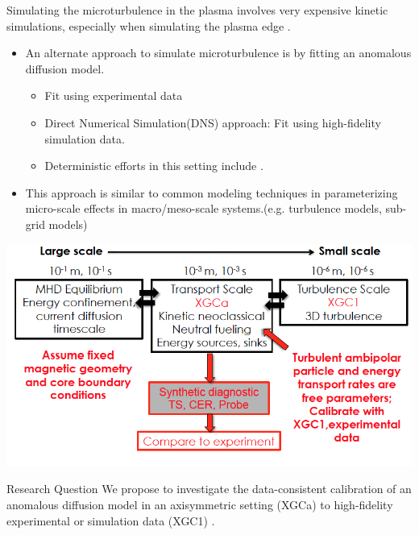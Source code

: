 \documentclass[11pt]{beamer}
\begin{document}
\begin{frame}
	
Simulating the microturbulence in the plasma involves very expensive kinetic simulations, 
especially when simulating the plasma edge \footnotemark[1]. 

\begin{itemize}
	\item An alternate approach to simulate microturbulence is by fitting an anomalous diffusion model.
	\begin{itemize} 
	\item Fit using  experimental data
 	\item Direct Numerical Simulation(DNS) approach: Fit using high-fidelity simulation data.
 	\item Deterministic efforts in this setting include \footnotemark[2]. 
\end{itemize}
\item This approach is similar to common modeling techniques in  parameterizing micro-scale
effects in macro/meso-scale systems.(e.g. turbulence models, sub-grid models) 

 \end{itemize}
 


\end{frame}
 
 \begin{frame}
 
 \centerline{ \includegraphics[height=.4\textheight]{xgca_calibrate.png}}
 
 \begin{block}{Research Question}
 We propose to investigate the data-consistent calibration of an anomalous diffusion model in an axisymmetric setting (XGCa) to high-fidelity experimental or simulation data (XGC1) \footnotemark[1].
\end{block}
	

\end{frame}
\end{document}
